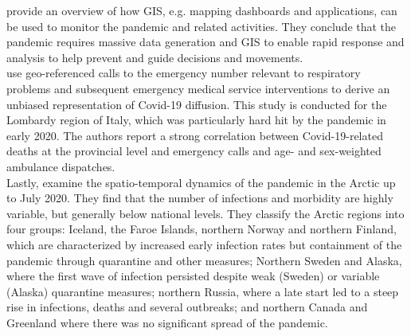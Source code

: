 \cite{saha2020monitoring} provide an overview of how GIS, e.g. mapping dashboards and applications, can be used to monitor the pandemic and related activities. They conclude that the pandemic requires massive data generation and GIS to enable rapid response and analysis to help prevent and guide decisions and movements. \\
\cite{gianquintieri2020mapping} use geo-referenced calls to the emergency number relevant to respiratory problems and subsequent emergency medical service interventions to derive an unbiased representation of Covid-19 diffusion. This study is conducted for the Lombardy region of Italy, which was particularly hard hit by the pandemic in early 2020. The authors report a strong correlation between Covid-19-related deaths at the provincial level and emergency calls and age- and sex-weighted ambulance dispatches.\\
Lastly, \cite{petrov2020spatiotemporal} examine the spatio-temporal dynamics of the pandemic in the Arctic up to July 2020. They find that the number of infections and morbidity are highly variable, but generally below national levels. They classify the Arctic regions into four groups: Iceland, the Faroe Islands, northern Norway and northern Finland, which are characterized by increased early infection rates but containment of the pandemic through quarantine and other measures; Northern Sweden and Alaska, where the first wave of infection persisted despite weak (Sweden) or variable (Alaska) quarantine measures; northern Russia, where a late start led to a steep rise in infections, deaths and several outbreaks; and northern Canada and Greenland where there was no significant spread of the pandemic.
